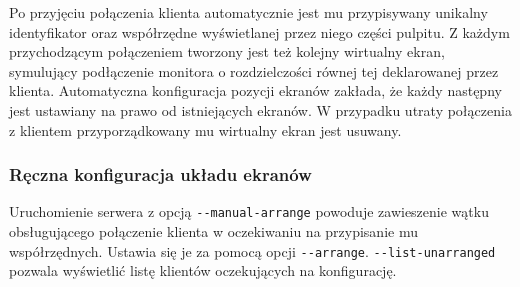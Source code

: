     Po przyjęciu połączenia klienta automatycznie jest mu przypisywany unikalny identyfikator oraz współrzędne wyświetlanej przez niego części pulpitu. Z każdym przychodzącym połączeniem tworzony jest też kolejny wirtualny ekran, symulujący podłączenie monitora o rozdzielczości równej tej deklarowanej przez klienta. Automatyczna konfiguracja pozycji ekranów zakłada, że każdy następny jest ustawiany na prawo od istniejących ekranów.
    W przypadku utraty połączenia z klientem przyporządkowany mu wirtualny ekran jest usuwany.

    \subsubsection{\label{sec:ManualConfig}Ręczna konfiguracja układu ekranów}
      Uruchomienie serwera z opcją \texttt{-{}-manual-arrange} powoduje zawieszenie wątku obsługującego połączenie klienta w oczekiwaniu na przypisanie mu współrzędnych. Ustawia się je za pomocą opcji \texttt{-{}-arrange}. \texttt{-{}-list-unarranged} pozwala wyświetlić listę klientów oczekujących na konfigurację.


